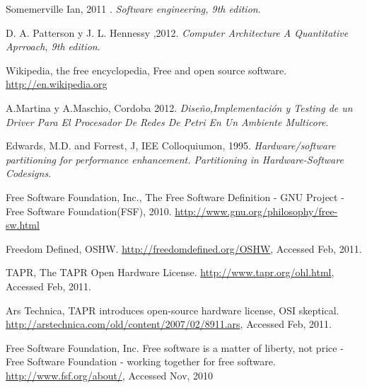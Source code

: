 \documentclass[a4paper,12pt]{report}
\begin{document}
\begin{thebibliography}{99}

 Somemerville Ian, 2011 .
  \textit{Software engineering, 9th edition}.

 D. A. Patterson y J. L. Hennessy ,2012.
  \textit{Computer Architecture A Quantitative Aprroach, 9th edition}.

Wikipedia, the free encyclopedia, Free and open source software.
\url{http://en.wikipedia.org}

A.Martina y A.Maschio, Cordoba 2012.
  \textit{Diseño,Implementación y Testing de un Driver Para El Procesador De Redes De Petri En Un Ambiente Multicore}.

 Edwards, M.D. and Forrest, J, IEE Colloquiumon, 1995.
  \textit{ Hardware/software partitioning for performance enhancement. Partitioning in Hardware-Software Codesigns}.


 Free Software Foundation, Inc., The Free Software Definition - GNU Project - Free Software Foundation(FSF), 2010.
 \url{http://www.gnu.org/philosophy/free-sw.html}




Freedom Defined, OSHW.
\url{ http://freedomdefined.org/OSHW}, Accessed Feb, 2011.

TAPR, The TAPR Open Hardware License. \url{http://www.tapr.org/ohl.html}, Accessed Feb, 2011.

Ars Technica, TAPR introduces open-source hardware license, OSI skeptical.
\url{http://arstechnica.com/old/content/2007/02/8911.ars}, Accessed Feb, 2011.

Free Software Foundation, Inc. Free software is a matter of liberty, not price - Free Software Foundation - working together for free software.
\url{http://www.fsf.org/about/}, Accessed Nov, 2010


\end{thebibliography}
\end{document}
